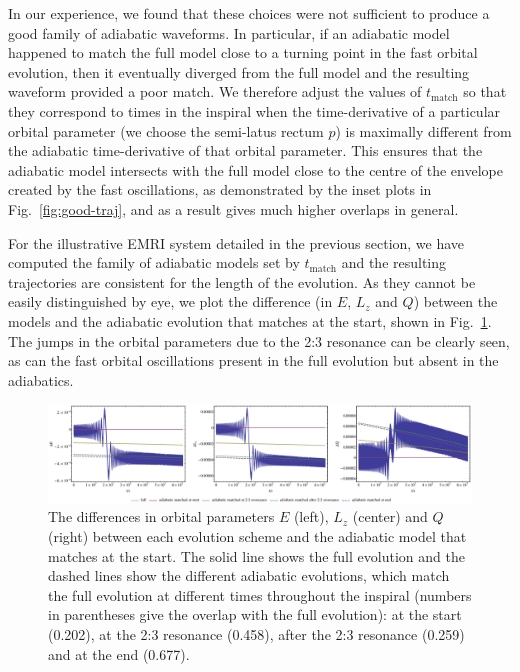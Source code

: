 \documentclass[aps,prd,amsfonts,amssymb,amsmath,nofootinbib,reprint,showpacs]{revtex4}
\newcommand{\figref}[1]{Fig.\ \ref{fig:#1}}
\begin{document}
In our experience, we found that these choices were not sufficient to produce a good family of adiabatic waveforms. In particular, if an adiabatic model happened to match the full model close to a turning point in the fast orbital evolution, then it eventually diverged from the full model and the resulting waveform provided a poor match. We therefore adjust the values of $t_{\mathrm{match}}$ so that they correspond to times in the inspiral when the time-derivative of a particular orbital parameter (we choose the semi-latus rectum $p$) is maximally different from the adiabatic time-derivative of that orbital parameter. This ensures that the adiabatic model intersects with the full model close to the centre of the envelope created by the fast oscillations, as demonstrated by the inset plots in \figref{good-traj}, and as a result gives much higher overlaps in general.

For the illustrative EMRI system detailed in the previous section, we have computed the family of adiabatic models set by $t_{\mathrm{match}}$ and the resulting trajectories are consistent for the length of the evolution. As they cannot be easily distinguished by eye, we plot the difference (in $E$, $L_z$ and $Q$) between the models and the adiabatic evolution that matches at the start, shown in \figref{res-diff-traj}. The jumps in the orbital parameters due to the 2:3 resonance can be clearly seen, as can the fast orbital oscillations present in the full evolution but absent in the adiabatics.

\begin{figure}[htbp]
\centering
\includegraphics[width=\textwidth]{Fig_res_diff_traj}
\caption{\label{fig:res-diff-traj}The differences in orbital parameters $E$ (left), $L_z$ (center) and $Q$ (right) between each evolution scheme and the adiabatic model that matches at the start. The solid line shows the full evolution and the dashed lines show the different adiabatic evolutions, which match the full evolution at different times throughout the inspiral (numbers in parentheses give the overlap with the full evolution): at the start (0.202), at the 2:3 resonance (0.458), after the 2:3 resonance (0.259) and at the end (0.677).}
\end{figure}
\end{document}
